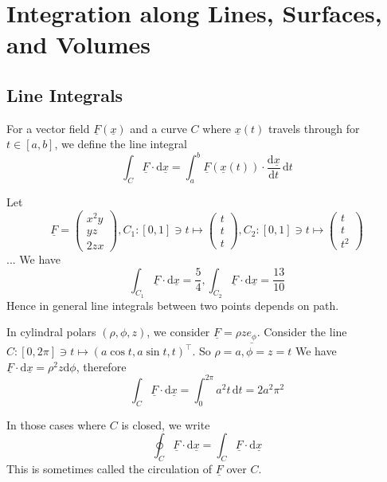 \section{Integration along Lines, Surfaces, and Volumes}
\subsection{Line Integrals}
\begin{definition}
    For a vector field $\underline{F}(\underline{x})$ and a curve $C$ where $\underline{x}(t)$ travels through for $t\in [a,b]$, we define the line integral
    $$\int_C\underline{F}\cdot\mathrm d\underline{x}=\int_a^b\underline{F}(\underline{x}(t))\cdot\frac{\mathrm d\underline{x}}{\mathrm dt}\,\mathrm dt$$
\end{definition}
\begin{example}
    Let
    $$\underline{F}=\begin{pmatrix}
        x^2y\\
        yz\\
        2zx
    \end{pmatrix},C_1:[0,1]\ni t\mapsto\begin{pmatrix}
        t\\
        t\\
        t
    \end{pmatrix},C_2:[0,1]\ni t\mapsto\begin{pmatrix}
        t\\
        t\\
        t^2
    \end{pmatrix}$$
    ...
    We have
    $$\int_{C_1}\underline{F}\cdot\mathrm d\underline{x}=\frac{5}{4},\int_{C_2}\underline{F}\cdot\mathrm d\underline{x}=\frac{13}{10}$$
    Hence in general line integrals between two points depends on path.
\end{example}
\begin{example}
    In cylindral polars $(\rho,\phi,z)$, we consider $\underline{F}=\rho z\underline{e_{\phi}}$.
    Consider the line $C:[0,2\pi]\ni t\mapsto (a\cos t,a\sin t,t)^\top$.
    So $\rho=a,\phi=z=t$
    We have $\underline{F}\cdot\mathrm d\underline{x}=\rho^2 z\mathrm d\phi$, therefore
    $$\int_C\underline{F}\cdot\mathrm d\underline{x}=\int_0^{2\pi}a^2t\,\mathrm dt=2a^2\pi^2$$
\end{example}
In those cases where $C$ is closed, we write
$$\oint_C\underline{F}\cdot\mathrm d\underline{x}=\int_C\underline{F}\cdot\mathrm d\underline{x}$$
This is sometimes called the circulation of $\underline{F}$ over $C$.
